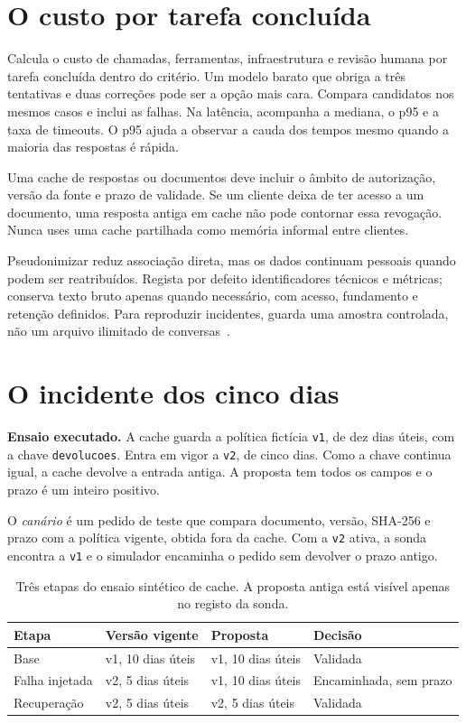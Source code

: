 \section{O custo por tarefa concluída}
Calcula o custo de chamadas, ferramentas, infraestrutura e revisão humana por tarefa concluída dentro do critério. Um modelo barato que obriga a três tentativas e duas correções pode ser a opção mais cara. Compara candidatos nos mesmos casos e inclui as falhas. Na latência, acompanha a mediana, o p95 e a taxa de timeouts. O p95 ajuda a observar a cauda dos tempos mesmo quando a maioria das respostas é rápida.

Uma cache de respostas ou documentos deve incluir o âmbito de autorização, versão da fonte e prazo de validade. Se um cliente deixa de ter acesso a um documento, uma resposta antiga em cache não pode contornar essa revogação. Nunca uses uma cache partilhada como memória informal entre clientes.

Pseudonimizar reduz associação direta, mas os dados continuam pessoais quando podem ser reatribuídos. Regista por defeito identificadores técnicos e métricas; conserva texto bruto apenas quando necessário, com acesso, fundamento e retenção definidos. Para reproduzir incidentes, guarda uma amostra controlada, não um arquivo ilimitado de conversas~\citep{rgpd2016}.

\section{O incidente dos cinco dias}
\textbf{Ensaio executado.} A cache guarda a política fictícia \texttt{v1}, de dez dias úteis, com a chave \texttt{devolucoes}. Entra em vigor a \texttt{v2}, de cinco dias. Como a chave continua igual, a cache devolve a entrada antiga. A proposta tem todos os campos e o prazo é um inteiro positivo.

O \emph{canário} é um pedido de teste que compara documento, versão, SHA-256 e prazo com a política vigente, obtida fora da cache. Com a \texttt{v2} ativa, a sonda encontra a \texttt{v1} e o simulador encaminha o pedido sem devolver o prazo antigo.

\begin{table}[htbp]
\small
\begin{tabularx}{\textwidth}{@{}>{\raggedright\arraybackslash}p{}>{\raggedright\arraybackslash}X>{\raggedright\arraybackslash}X>{\raggedright\arraybackslash}X@{}}
\toprule
Etapa & Versão vigente & Proposta & Decisão \\
\midrule
Base & v1, 10 dias úteis & v1, 10 dias úteis & Validada \\
Falha injetada & v2, 5 dias úteis & v1, 10 dias úteis & Encaminhada, sem prazo \\
Recuperação & v2, 5 dias úteis & v2, 5 dias úteis & Validada \\
\bottomrule
\end{tabularx}
\caption{Três etapas do ensaio sintético de cache. A proposta antiga está visível apenas no registo da sonda.}
\label{tab:incidente-cache}
\end{table}


